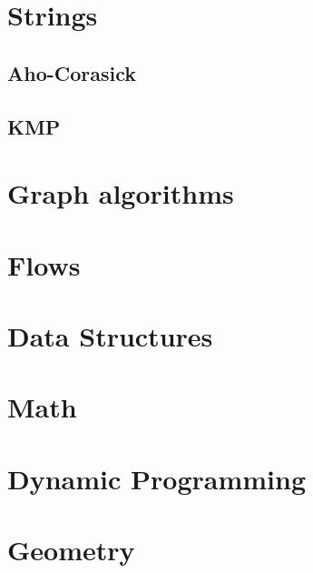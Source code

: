 \section{Strings}
\subsection{Aho-Corasick}
\raggedbottom
\hrulefill
\subsection{KMP}
\raggedbottom
\hrulefill

\section{Graph algorithms}

\section{Flows}

\section{Data Structures}

\section{Math}

\section{Dynamic Programming}

\section{Geometry}

